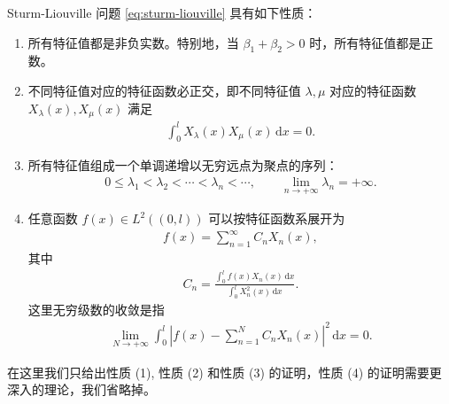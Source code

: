 \documentclass[../../main.tex]{subfiles}%
\begin{document}
\begin{theorem}
Sturm-Liouville 问题 \eqref{eq:sturm-liouville} 具有如下性质：
\begin{enumerate}[(1)]
\item 所有特征值都是非负实数。特别地，当 $\beta_1+\beta_2>0$ 时，所有特征值都是正数。
\item 不同特征值对应的特征函数必正交，即不同特征值 $\lambda,\mu$ 对应的特征函数 $X_\lambda(x),X_\mu(x)$ 满足
\begin{align*}
\int_0^l X_\lambda(x)X_\mu(x)\,\mathrm{d}x=0.
\end{align*}
\item 所有特征值组成一个单调递增以无穷远点为聚点的序列：
\begin{align*}
0\leqslant \lambda_1<\lambda_2<\cdots<\lambda_n<\cdots,\qquad \lim_{n\to+\infty}\lambda_n=+\infty.
\end{align*}
\item 任意函数 $f(x)\in L^2((0,l))$ 可以按特征函数系展开为
\begin{align*}
f(x)=\sum_{n=1}^{\infty}C_nX_n(x),
\end{align*}
其中
\begin{align*}
C_n=\frac{\int_0^l f(x)X_n(x)\,\mathrm{d}x}{\int_0^l X_n^2(x)\,\mathrm{d}x}.
\end{align*}
这里无穷级数的收敛是指
\begin{align*}
\lim_{N\to+\infty}\int_0^l \left| f(x)-\sum_{n=1}^N C_nX_n(x) \right|^2\,\mathrm{d}x=0.
\end{align*}
\end{enumerate}
\end{theorem}
\begin{remark}
在这里我们只给出性质 (1), 性质 (2) 和性质 (3) 的证明，性质 (4) 的证明需要更深入的理论，我们省略掉。
\end{remark}
\end{document}
